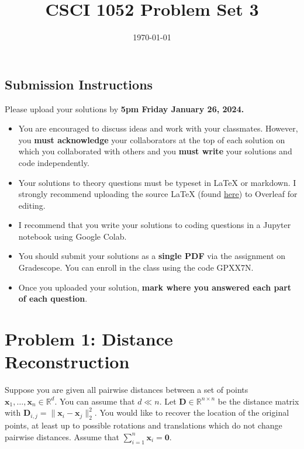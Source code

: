\documentclass{article}
\title{CSCI 1052 Problem Set 3}
\author{} %
\date{\today}
\begin{document}
\maketitle

\subsection*{Submission Instructions}

Please upload your solutions by
\textbf{5pm Friday January 26, 2024.}
\begin{itemize}
\item You are encouraged to discuss ideas
and work with your classmates. However, you
\textbf{must acknowledge} your collaborators
at the top of each solution on which
you collaborated with others 
and you \textbf{must write} your solutions and code
independently.
\item Your solutions to theory questions must
be typeset in LaTeX or markdown.
I strongly recommend uploading the source LaTeX (found 
\href{https://www.rtealwitter.com/rads2024/psets/pset3.tex}{here})
to Overleaf for editing.
\item I recommend that you write your solutions to coding questions in a Jupyter notebook using Google Colab.
\item You should submit your solutions as a \textbf{single PDF} via the assignment on Gradescope. You can enroll in the class using the code GPXX7N.
\item Once you uploaded your solution, \textbf{mark where you answered each part of each question}.
\end{itemize}

\newpage

\section*{Problem 1: Distance Reconstruction}

Suppose you are given all pairwise distances between a set of points $\mathbf{x}_1, \ldots, \mathbf{x}_n \in \mathbb{R}^d$.
You can assume that $d \ll n$.
Let $\mathbf{D} \in \mathbb{R}^{n \times n}$ be the distance matrix with $\mathbf{D}_{i,j} = \| \mathbf{x}_i - \mathbf{x}_j \|_2^2$.
You would like to recover the location of the original points, at least up to possible rotations and translations which do not change pairwise distances.
Assume that $\sum_{i=1}^n \mathbf{x}_i = \mathbf{0}$.
\end{document}
